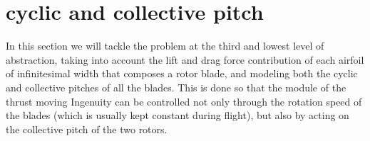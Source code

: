 \section{ cyclic and collective pitch}
In this section we will tackle the problem at the third and lowest level of abstraction, taking into account the lift and drag force contribution of each airfoil of infinitesimal width that composes a rotor blade, and modeling both the cyclic and collective pitches of all the blades. This is done so that the module of the thrust moving Ingenuity can be controlled not only through the rotation speed of the blades (which is usually kept constant during flight), but also by acting on the collective pitch of the two rotors.

